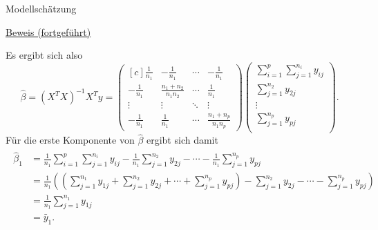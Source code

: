\documentclass[
  8pt,
  ignorenonframetext,
]{beamer}
\begin{document}
\begin{frame}{Modellschätzung}
\protect\hypertarget{modellschuxe4tzung-4}{}
\vspace{2mm}
\footnotesize

\underline{Beweis (fortgeführt)}

Es ergibt sich also \tiny \begin{equation}
\renewcommand{\arraystretch}{2}
\hat{\beta}
= (X^T X)^{-1}X^Ty
=
\begin{pmatrix*}[c]
   \frac{1}{n_1}
& -\frac{1}{n_1}
& \cdots
& -\frac{1}{n_1}
\\
  -\frac{1}{n_1}
& \frac{n_1+n_2}{n_1 n_2}
& \cdots
& \frac{1}{n_1}
\\
  \vdots
& \vdots
& \ddots
& \vdots
\\
 -\frac{1}{n_1}
& \frac{1}{n_1}
& \cdots
& \frac{n_1+n_p}{n_1 n_p}
\end{pmatrix*}
\begin{pmatrix}
\sum_{i=1}^p \sum_{j=1}^{n_i} y_{ij}    \\
\sum_{j=1}^{n_2} y_{2j}                 \\
\vdots                                  \\
\sum_{j=1}^{n_p} y_{pj}                 \\
\end{pmatrix}.
\end{equation} \footnotesize Für die erste Komponente von
\(\hat{\beta}\) ergibt sich damit \tiny \begin{align}
\begin{split}
\hat{\beta}_1
& =
\frac{1}{n_1}\sum_{i=1}^p \sum_{j=1}^{n_i} y_{ij}
- \frac{1}{n_1}\sum_{j=1}^{n_2} y_{2j}
- \cdots
- \frac{1}{n_1}\sum_{j=1}^{n_p} y_{pj}
\\
& =
\frac{1}{n_1}
\left(
\left(
  \sum_{j=1}^{n_1} y_{1j}
+ \sum_{j=1}^{n_2} y_{2j}
+ \cdots
+ \sum_{j=1}^{n_p} y_{pj}
\right)
- \sum_{j=1}^{n_2} y_{2j}
- \cdots
- \sum_{j=1}^{n_p} y_{pj}
\right)
\\
& = \frac{1}{n_1}\sum_{j=1}^{n_1} y_{1j}
\\
&
= \bar{y}_1.
\end{split}
\end{align}
\end{frame}
\end{document}
